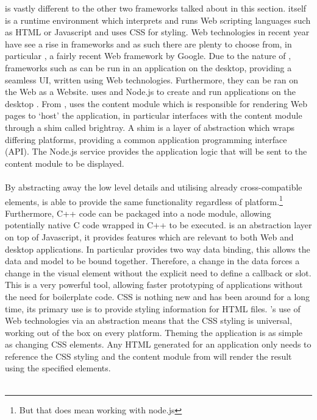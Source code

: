 is vastly different to the other two frameworks talked about in this section.  itself is a runtime environment which interprets and runs Web scripting languages such as HTML or Javascript and uses CSS for styling\cite{electron}. Web technologies in recent year have see a rise in frameworks and as such there are plenty to choose from, in particular , a fairly recent Web framework by Google. Due to the nature of , frameworks such as  can be run in an application on the desktop, providing a seamless UI, written using Web technologies. Furthermore, they can be ran on the Web as a Website.
%
   uses  and Node.js to create and run applications on the desktop \cite{electron_about}. From ,  uses the content module which is responsible for rendering Web pages to `host' the application, in particular  interfaces with the content module through a shim called brightray\cite{electron_content_module}. A shim is a layer of abstraction which wraps differing platforms, providing a common application programming interface (API). The Node.js service provides the application logic that will be sent to the content module to be displayed.\\\\
  By abstracting away the low level details and utilising already cross-compatible elements,  is able to provide the same functionality regardless of platform.\footnote{But that does mean working with node.js} Furthermore, C++ code can be packaged into a node module, allowing potentially native C code wrapped in C++ to be executed.
   is an abstraction layer on top of Javascript, it provides features which are relevant to both Web and desktop applications\cite{angular}. In particular  provides two way data binding, this allows the data and model to be bound together\cite{angular_data_binding}. Therefore, a change in the data forces a change in the visual element without the explicit need to define a callback or slot. This is a very powerful tool, allowing faster prototyping of applications without the need for boilerplate code.
  CSS is nothing new and has been around for a long time, its primary use is to provide styling information for HTML files. 's use of Web technologies via an abstraction means that the CSS styling is universal, working out of the box on every platform. Theming the application is as simple as changing CSS elements. Any HTML generated for an application only needs to reference the CSS styling and the content module from  will render the result using the specified elements.\\\\
